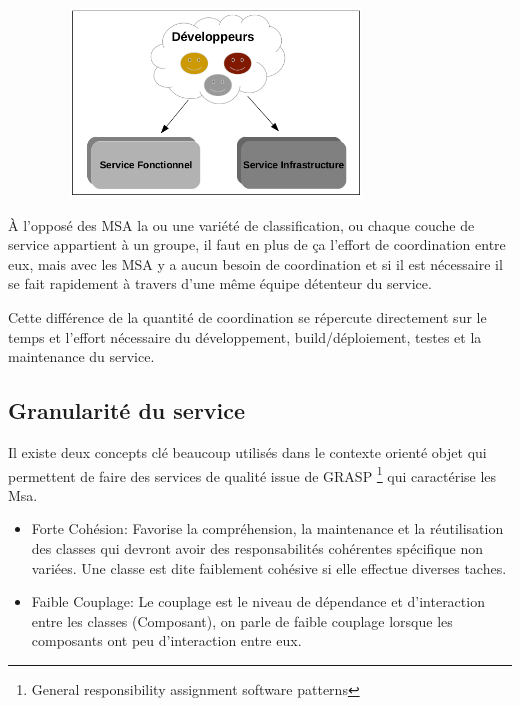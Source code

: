 \documentclass[12pt, a4paper, openany]{report}
\begin{document}
   \begin{center}
     \includegraphics[width=11cm, height=5cm]{detenteur_service_msa_6.png}
     \label{fig6}
   \end{center}
   
   À l'opposé des MSA la ou une variété de classification, ou chaque couche de service appartient à un groupe, il faut en plus de ça l'effort de coordination entre eux, mais avec les MSA y a aucun besoin de coordination et si il est nécessaire il se fait rapidement à travers d'une même équipe détenteur du service.
   
   Cette différence de la quantité de coordination se répercute directement sur le temps et l'effort nécessaire du développement, build/déploiement, testes et la maintenance du service.
   
   \subsection{Granularité du service}
   Il existe deux concepts clé beaucoup utilisés dans le contexte orienté objet qui permettent de faire des services de qualité issue de GRASP \footnote{General responsibility assignment software patterns} qui caractérise les Msa.
   \begin{itemize}
      \item Forte Cohésion: Favorise la compréhension, la maintenance et la réutilisation des classes qui devront avoir des responsabilités cohérentes spécifique non variées. Une classe est dite faiblement cohésive si elle effectue diverses taches.\cite{refbib5}
      \item Faible Couplage: Le couplage est le niveau de dépendance et d’interaction entre les classes (Composant), on parle de faible couplage lorsque les composants ont peu d’interaction entre eux.\cite{refbib5}
  \end{itemize}
  
\end{document}
